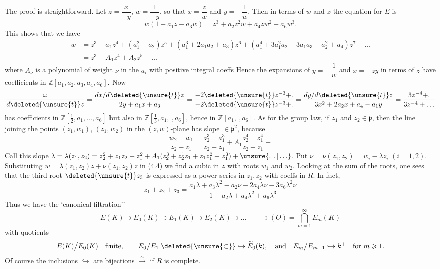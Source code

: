 
\begingroup
\makeatletter\tagsleft@true\makeatother
The proof is straightforward. Let $z=\dfrac{x}{-y}$, $w=\dfrac{1}{-y}$, so that $x=\dfrac{z}{w}$ and $y=-\dfrac{1}{w}$. Then in terms of $w$ and $z$ the equation for $E$ is
\[
 w(1-a_1z-a_3w)=z^3+a_2z^2w+a_4zw^2+a_6w^3.
 \tag*{(4.4)}
\]
This shows that we have
\begingroup\scriptsize
\[
\begin{aligned}
w&=z^3+a_1z^4+(a_1^2+a_2)z^5+(a_1^3+2a_1a_2+a_3)z^6+
 (a_1^4+3a_1^2a_2+3a_1a_3+a_2^2+a_4)z^7+\ldots\\
 &=z^3+A_1z^4+A_2z^5+\ldots
\end{aligned}
\tag*{(4.5)}
\]
\endgroup
where $A_\nu$ is a polynomial of weight $\nu$ in the $a_i$ with positive integral coeffs Hence the expansions of $y=-\dfrac{1}{w}$ and $x=-zy$ in terms of $z$ have coefficients in $\mathbb{Z}[a_1,a_2,a_3,a_4,a_6]$. Now
\[
 \frac{\omega}{d\deleted{\unsure{t}}z}=
 \frac{dx/d\deleted{\unsure{t}}z}{2y+a_1x+a_3}=
 \frac{-2\deleted{\unsure{t}}z^{-3}+\ldotp}{-2\deleted{\unsure{t}}z^{-3}+\ldotp}=
 \frac{dy/d\deleted{\unsure{t}}z}{3x^2+2a_2x+a_4-a_1y}=
 \frac{3z^{-4}+\ldotp}{3z^{-4}+\ldots}
\]
has coefficients in $\mathbb{Z}[\frac{1}{2},a_1,\ldots,a_6]$ but also in $\mathbb{Z}[\frac{1}{3},a_1,\ ,a_6]$, hence in $\mathbb{Z}[a_1,\ ,a_6]$. As for the group law, if $z_1$ and $z_2\in\mathfrak{p}$, then the line joining the points $(z_1,w_1)$, $(z_1,w_2)$ in the $(z,w)$-plane has slope $\in\mathfrak{p}^2$, because
\[
 \frac{w_2-w_1}{z_2-z_1}=
 \frac{z_2^3-z_1^3}{z_2-z_1}
 +A_1\frac{z_2^4-z_1^4}{z_2-z_1}+
\]
Call this slope $\lambda=\lambda(z_1,z_2)=z_2^2+z_1z_2+z_1^2+A_1(z_2^3+z_2^1z_1+z_1z_1^2+z_1^3)+\unsure{\ldotp\,\ldotp|\ldots}$. Put $\nu=\nu(z_1,z_2)=w_i-\lambda z_i$ $(i=1,2)$. Substituting $w=\lambda(z_1,z_2)z+\nu(z_1,z_2)z$ in (4.4) we find a cubic in $z$ with roots $w_1$ and $w_2$. Looking at the sum of the roots, one sees that the third root $\deleted{\unsure{t}}z_3$ is expressed as a power series in $z_1,z_2$ with coeffs in $R$. In fact,
\[
 z_1+z_2+z_3=
 \frac{a_1\lambda+a_3\lambda^2-a_2\nu-2a_4\lambda\nu-3a_6\lambda^2\nu}
 {1+a_2\lambda+a_4\lambda^2+a_6\lambda^3}
 \tag*{(4.6)}
\]
Thus we have the `canonical filtration''
\[
 E(K)\supset E_0(K)\supset E_1(K)\supset E_2(K)\supset\ldots
 \qquad\supset(O)=\bigcap_{m=1}^{\infty}E_m(K)
 \tag*{(4.7)}
\]
with quotients
\begingroup\small
\[
 E(K)\big/E_0(K)\quad\text{finite},\qquad
 E_0\big/E_1\mathrel{\deleted{\unsure{\subset}}\hookrightarrow}\widetilde E_0(k),
 \quad\text{and}\quad E_m\big/E_{m+1}\hookrightarrow k^+
 \quad\text{for }m\geqslant1.
\]
\endgroup
Of course the inclusions $\hookrightarrow$ are bijections $\overset{\sim}{\to}$ if $R$ is complete.
\endgroup


